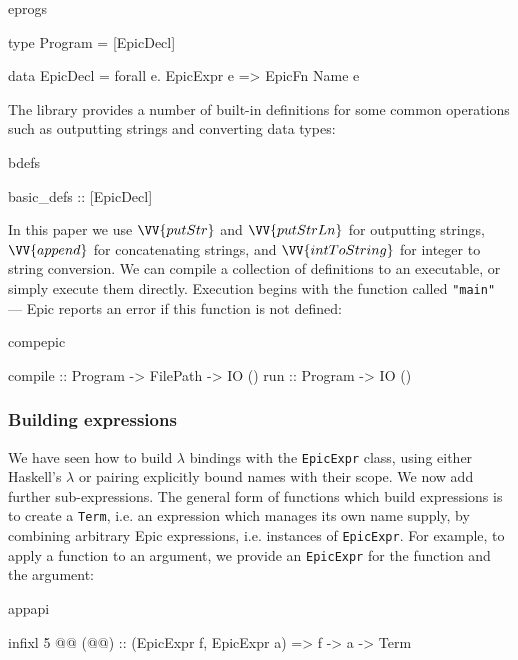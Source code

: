 \begin{SaveVerbatim}{eprogs}

type Program = [EpicDecl]

data EpicDecl = forall e. EpicExpr e => EpicFn Name e

\end{SaveVerbatim}

\noindent
The library provides a number of built-in definitions for some common
operations such as outputting strings and converting data types:

\begin{SaveVerbatim}{bdefs}

basic_defs :: [EpicDecl]

\end{SaveVerbatim}

\noindent
In this paper we use $\VV{putStr}$ and $\VV{putStrLn}$ for outputting
strings, $\VV{append}$ for concatenating strings, and
$\VV{intToString}$ for integer to string conversion.
We can compile a collection of definitions to an executable, or simply
execute them directly. Execution begins with the function called
\texttt{"main"} --- Epic reports an error if this function is not
defined:

\begin{SaveVerbatim}{compepic}

compile :: Program -> FilePath -> IO ()
run     :: Program -> IO ()

\end{SaveVerbatim}

\subsubsection*{Building expressions}

We have seen how to build $\lambda$ bindings with the
\texttt{EpicExpr} class, using either Haskell's $\lambda$ or pairing
explicitly bound names with their scope. We now add further
sub-expressions.  The general form of functions which build
expressions is to create a \texttt{Term}, i.e. an expression which
manages its own name supply, by combining arbitrary Epic
expressions, i.e. instances of \texttt{EpicExpr}. For example, to
apply a function to an argument, we provide an \texttt{EpicExpr} for
the function and the argument:

\begin{SaveVerbatim}{appapi}

infixl 5 @@
(@@) :: (EpicExpr f, EpicExpr a) => f -> a -> Term

\end{SaveVerbatim}

